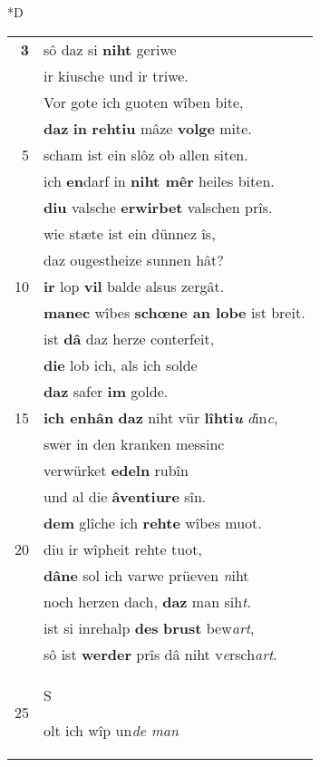 \documentclass[8pt,a4paper,notitlepage]{article}
\begin{document}
\begin{table}[ht]
\begin{minipage}[t]{0.5\linewidth}
\small
\begin{center}*D
\end{center}
\begin{tabular}{rl}
\textbf{3} & sô daz si \textbf{niht} geriwe\\ 
 & ir kiusche und ir triwe.\\ 
 & Vor gote ich guoten wîben bite,\\ 
 & \textbf{daz} \textbf{in} \textbf{rehtiu} mâze \textbf{volge} mite.\\ 
5 & scham ist ein slôz ob allen siten.\\ 
 & ich \textbf{en}darf in \textbf{niht mêr} heiles biten.\\ 
 & \textbf{diu} valsche \textbf{erwirbet} valschen prîs.\\ 
 & wie stæte ist ein dünnez îs,\\ 
 & daz ougestheize sunnen hât?\\ 
10 & \textbf{ir} lop \textbf{vil} balde alsus zergât.\\ 
 & \textbf{manec} wîbes \textbf{schœne an lobe} ist breit.\\ 
 & ist \textbf{dâ} daz herze conterfeit,\\ 
 & \textbf{die} lob ich, als ich solde\\ 
 & \textbf{daz} safer \textbf{im} golde.\\ 
15 & \textbf{ich enhân} \textbf{daz} niht vür \textbf{lîhti\textit{u}} \textit{d}in\textit{c},\\ 
 & swer in den kranken messinc\\ 
 & verwürket \textbf{edeln} rubîn\\ 
 & und al die \textbf{âventiure} sîn.\\ 
 & \textbf{dem} glîche ich \textbf{rehte} wîbes muot.\\ 
20 & diu ir wîpheit rehte tuot,\\ 
 & \textbf{dâ}\textbf{ne} sol ich varwe prüeven \textit{n}iht\\ 
 & noch herzen dach, \textbf{daz} man sih\textit{t}.\\ 
 & ist si inrehalp \textbf{des} \textbf{brust} bew\textit{art},\\ 
 & sô ist \textbf{werder} prîs dâ niht v\textit{e}rsch\textit{art}.\\ 
25 & \begin{Large}S\end{Large}olt ich wîp un\textit{de man}\\ 

\end{tabular}
\end{minipage}
\end{table}
\end{document}
